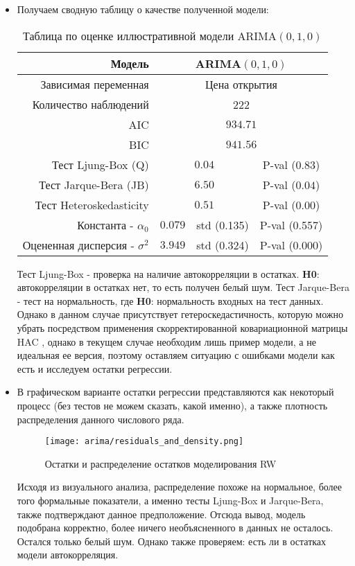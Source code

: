 \begin{itemize}
		\item Получаем сводную таблицу о качестве полученной модели:
		\begin{table}[H]
			\centering
			\begin{tabular}{r|ccc}
				\toprule
				Модель & \multicolumn{3}{c}{ARIMA$(0, 1, 0)$}\\
				\midrule[0.02cm]
				Зависимая переменная & \multicolumn{3}{c}{Цена открытия}\\
				Количество наблюдений & \multicolumn{3}{c}{222} \\
				AIC & \multicolumn{3}{c}{$934.71$} \\
				BIC & \multicolumn{3}{c}{$941.56$} \\
				\midrule[0.02cm]
				Тест Ljung-Box (Q) & \multicolumn{2}{c}{$0.04$} & P-val ($0.83$)\\
				Тест Jarque-Bera (JB) & \multicolumn{2}{c}{$6.50$} & P-val ($0.04$)\\
				Тест Heteroskedasticity & \multicolumn{2}{c}{$0.51$} & P-val ($0.00$)\\
				\midrule[0.02cm]
				Константа - $\alpha_0$ & $0.079$ & std (0.135) & P-val (0.557)\\
				Оцененная дисперсия - $\sigma^2$ & $3.949$ & std (0.324) & P-val (0.000)\\
				\midrule[0.02cm]
			\end{tabular}
			\caption{Таблица по оценке иллюстративной модели ARIMA$(0,1,0)$}
		\end{table}
		Тест Ljung-Box \cite{ljung_box_test} - проверка на наличие автокорреляции в остатках. \textbf{H0}: автокорреляции в остатках нет, то есть получен белый шум. Тест Jarque-Bera \cite{jarque_bera_test}- тест на нормальность, где \textbf{H0}: нормальность входных на тест данных. Однако в данном случае присутствует гетероскедастичность, которую можно убрать посредством применения скорректированной ковариационной матрицы HAC \cite{hac_standard_errors}, однако в текущем случае необходим лишь пример модели, а не идеальная ее версия, поэтому оставляем ситуацию с ошибками модели как есть и исследуем остатки регрессии.
		\item В графическом варианте остатки регрессии представляются как некоторый процесс (без тестов не можем сказать, какой именно), а также плотность распределения данного числового ряда.
		\begin{figure}[H]
			\centering
			\texttt{[image: arima/residuals\_and\_density.png]}
			\caption{Остатки и распределение остатков моделирования RW}
		\end{figure}
		Исходя из визуального анализа, распределение похоже на нормальное, более того формальные показатели, а именно тесты Ljung-Box и Jarque-Bera, также подтверждают данное предположение. Отсюда вывод, модель подобрана корректно, более ничего необъясненного в данных не осталось. Остался только белый шум. Однако также проверяем: есть ли в остатках модели автокорреляция.
		

\end{itemize}

